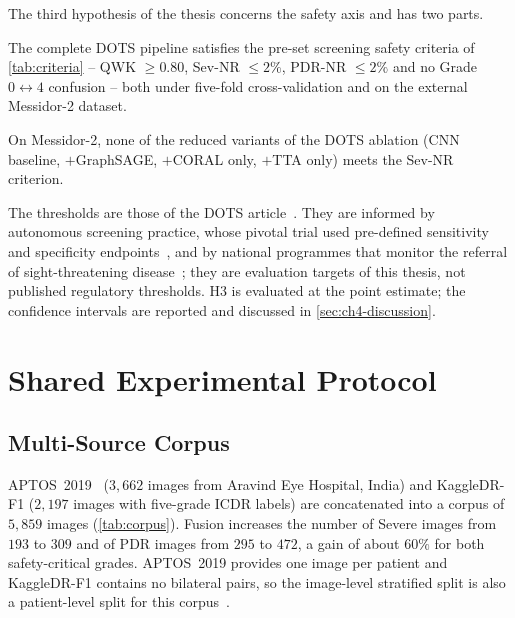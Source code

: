 The third hypothesis of the thesis concerns the safety axis and has two parts.
\begin{description}[leftmargin=1.4em,style=sameline,itemsep=2pt]
\item[H3a (sufficiency).] The complete DOTS pipeline satisfies the pre-set screening safety criteria
of \cref{tab:criteria} -- QWK $\geq0.80$, Sev-NR $\leq2\%$, PDR-NR $\leq2\%$ and no
Grade~$0\leftrightarrow4$ confusion -- both under five-fold cross-validation and on the
external Messidor-2 dataset.
\item[H3b (necessity within the ablation).] On Messidor-2, none of the reduced variants of
the DOTS ablation (CNN baseline, $+$GraphSAGE, $+$CORAL only, $+$TTA only) meets the
Sev-NR criterion.
\end{description}
The thresholds are those of the DOTS article~\cite{belhadj2026dots}. They are informed by
autonomous screening practice, whose pivotal trial used pre-defined sensitivity and
specificity endpoints~\cite{abramoff2018pivotal}, and by national programmes that monitor
the referral of sight-threatening disease~\cite{scanlon2017english}; they are evaluation
targets of this thesis, not published regulatory thresholds. H3 is evaluated at the point estimate; the confidence intervals are reported
and discussed in \cref{sec:ch4-discussion}.

\section{Shared Experimental Protocol}
\label{sec:ch4-protocol}\label{sec:protocol}

\subsection{Multi-Source Corpus}

APTOS~2019~\cite{aptos2019} ($3{,}662$ images from Aravind Eye Hospital, India) and
KaggleDR-F1 ($2{,}197$ images with five-grade ICDR labels) are concatenated into a
corpus of $5{,}859$ images (\cref{tab:corpus}). Fusion increases the number of Severe images
from $193$ to $309$ and of PDR images from $295$ to $472$, a gain of about $60\%$ for both
safety-critical grades. APTOS~2019 provides one image per patient and KaggleDR-F1 contains
no bilateral pairs, so the image-level stratified split is also a patient-level
split for this corpus~\cite{belhadj2026dgts}.

